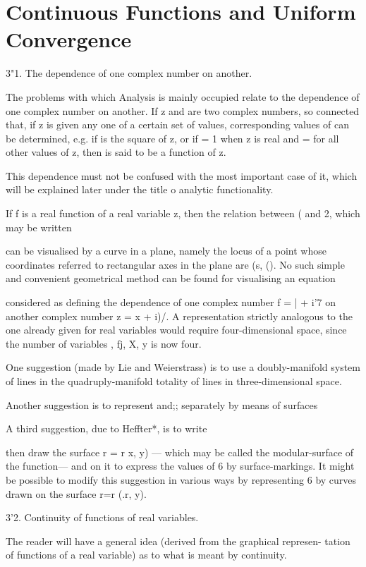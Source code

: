 \chapter{Continuous Functions and Uniform Convergence} 

3"1. The dependence of one complex number on another.

The problems with which Analysis is mainly occupied relate to the
dependence of one complex number on another. If z and are two complex
numbers, so connected that, if z is given any one of a certain set of
values, corresponding values of can be determined, e.g. if is the
square of z, or if = 1 when z is real and = for all other values of z,
then is said to be a function of z.

This dependence must not be confused with the most important case of
it, which will be explained later under the title o analytic
functionality.

If f is a real function of a real variable z, then the relation
between ( and 2, which may be written

can be visualised by a curve in a plane, namely the locus of a point
whose coordinates referred to rectangular axes in the plane are (s,
(). No such simple and convenient geometrical method can be found for
visualising an equation

considered as defining the dependence of one complex number f = | +
i'7 on another complex number z = x + i)/. A representation strictly
analogous to the one already given for real variables would require
four-dimensional space, since the number of variables , fj, X, y is
now four.

One suggestion (made by Lie and Weierstrass) is to use a
doubly-manifold system of lines in the quadruply-manifold totality of
lines in three-dimensional space.

Another suggestion is to represent and;; separately by means of
surfaces

A third suggestion, due to Heffter*, is to write

then draw the surface r = r x, y) — which may be called the
modular-surface of the function— and on it to express the values of 6
by surface-markings. It might be possible to modify this suggestion in
various ways by representing 6 by curves drawn on the surface r=r (.r,
y).

3'2. Continuity of functions of real variables.

The reader will have a general idea (derived from the graphical
represen- tation of functions of a real variable) as to what is meant
by continuity.

